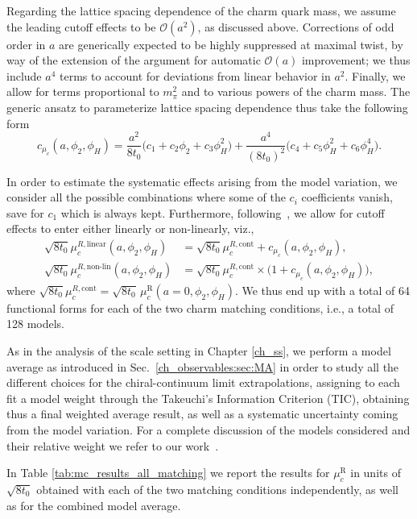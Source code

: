 Regarding the lattice spacing dependence of the charm quark mass, we assume the leading cutoff effects to 
be $\mathcal{O}(a^2)$, as discussed above. Corrections of odd order in $a$ are generically expected to be highly
suppressed at maximal twist, by way of the extension of the argument for automatic $\mathcal{O}(a)$
improvement; we thus include $a^4$ terms to account for deviations from linear behavior
in $a^2$. Finally, we allow for terms proportional to $m_\pi^2$ and to various powers of the charm
mass. The generic ansatz to parameterize lattice spacing dependence thus take the following form
\begin{equation}
	c_{\mu_c}(a, \phi_2, \phi_H) = \frac{a^2}{8t_0} \big(
	c_1 + c_2\phi_2 + c_3 \phi_H^2
	\big)
	+
	\frac{a^4}{(8t_0)^2}\big(
	c_4 + c_5\phi_H^2 + c_6 \phi_H^4
	\big).
	\label{eq:lattice_spacing_dependence}
\end{equation} 

In order to estimate the systematic effects arising from the model variation, we consider all the possible 
combinations where some of the $c_i$ coefficients vanish, save for $c_1$ which is always kept.
Furthermore, following~\cite{Heitger:2021apz}, we allow for cutoff effects to enter either linearly or 
non-linearly, viz.,
  \begin{align} 	\label{eq:tot_model}
 	\sqrt{8t_0}\mu_c^{R,\text{linear}}(a, \phi_2,\phi_H) &=
 	\sqrt{8t_0}\mu_c^{R,\text{cont}} + c_{\mu_c}(a, \phi_2,\phi_H),
 	\\
 	\sqrt{8t_0}\mu_c^{R,\text{non-lin}}(a, \phi_2,\phi_H) &=
 	\sqrt{8t_0}\mu_c^{R,\text{cont}} \times\big(1+ c_{\mu_c}(a, \phi_2,\phi_H)\big), \nonumber
 \end{align}
where $\sqrt{8t_0}\mu_c^{R,\text{cont}}=\sqrt{8t_0}\, \mu_c^{\textrm{R}}(a=0, \phi_2, \phi_H)$. We thus end up with a total of 64 functional forms for each of the two charm matching conditions,
i.e., a total of 128 models.

As in the analysis of the scale setting in Chapter \ref{ch_ss}, we perform a model average as introduced in Sec.~\ref{ch_observables:sec:MA} in order to study all the different choices for the chiral-continuum limit extrapolations, assigning to each fit a model weight through the Takeuchi's Information Criterion (TIC), obtaining thus a final weighted average result, as well as a systematic uncertainty coming from the model variation. For a complete discussion of the models considered and their relative weight we refer to our work~\citep{charm}.

In Table \ref{tab:mc_results_all_matching} we report the results for $\mu_c^{\textrm{R}}$
in units of $\sqrt{8t_0}$ obtained with each of the two matching conditions independently,
as well as for the combined model average.  

